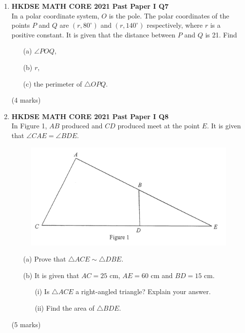 \documentclass[12pt]{article}
\begin{document}
\begin{enumerate}
	\item \textbf{HKDSE MATH CORE 2021 Past Paper I Q7}\\
	In a polar coordinate system, $O$ is the pole. The polar coordinates of the points $P$ and $Q$ are $(r, 80^\circ)$ and $(r, 140^\circ)$ respectively, where $r$ is a positive constant. It is given that the distance between $P$ and $Q$ is 21. Find	
	\begin{enumerate}
		\item[(a)] $\angle POQ$,
		\item[(b)] $r$,
		\item[(c)] the perimeter of $\triangle OPQ$.
	\end{enumerate}
	(4 marks)
	
	\item \textbf{HKDSE MATH CORE 2021 Past Paper I Q8}\\
	In Figure 1, $AB$ produced and $CD$ produced meet at the point $E$. It is given that $\angle CAE = \angle BDE$.
	\begin{figure}[H]
		\centering
		\includegraphics[width = .3\linewidth]{2021Figure1.1}
	\end{figure}
	\begin{enumerate}
		\item[(a)] Prove that $\triangle ACE \sim \triangle DBE$.
		\item[(b)] It is given that $AC = 25$ cm, $AE = 60$ cm and $BD = 15$ cm.
		\begin{enumerate}
			\item[(i)] Is $\triangle ACE$ a right-angled triangle? Explain your answer.
			\item[(ii)] Find the area of $\triangle BDE$.
		\end{enumerate}
	\end{enumerate}
	(5 marks)	
	

\end{enumerate}
\end{document}
